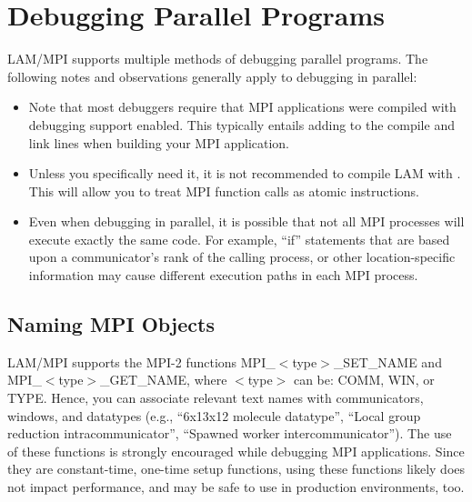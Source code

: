%
% 
%
%

\chapter{Debugging Parallel Programs}
\label{sec:debug}
\label{sec:debugging}

LAM/MPI supports multiple methods of debugging parallel programs.  The
following notes and observations generally apply to debugging in
parallel:

\begin{itemize}
\item Note that most debuggers require that MPI applications were
  compiled with debugging support enabled.  This typically entails
  adding  to the compile and link lines when building
  your MPI application.
  
\item Unless you specifically need it, it is not recommended to
  compile LAM with .  This will allow you to treat MPI
  function calls as atomic instructions.

\item Even when debugging in parallel, it is possible that not all MPI
  processes will execute exactly the same code.  For example, ``if''
  statements that are based upon a communicator's rank of the calling
  process, or other location-specific information may cause different
  execution paths in each MPI process.
\end{itemize}



\section{Naming MPI Objects}

LAM/MPI supports the MPI-2 functions {\sf
  MPI\_\-$<$type$>$\_\-SET\_\-NAME} and {\sf
  MPI\_\-$<$type$>$\_\-GET\_\-NAME}, where {\sf $<$type$>$} can be:
{\sf COMM}, {\sf WIN}, or {\sf TYPE}.  Hence, you can associate
relevant text names with communicators, windows, and datatypes (e.g.,
``6x13x12 molecule datatype'', ``Local group reduction
intracommunicator'', ``Spawned worker intercommunicator'').  The use
of these functions is strongly encouraged while debugging MPI
applications.  Since they are constant-time, one-time setup functions,
using these functions likely does not impact performance, and may be
safe to use in production environments, too.

